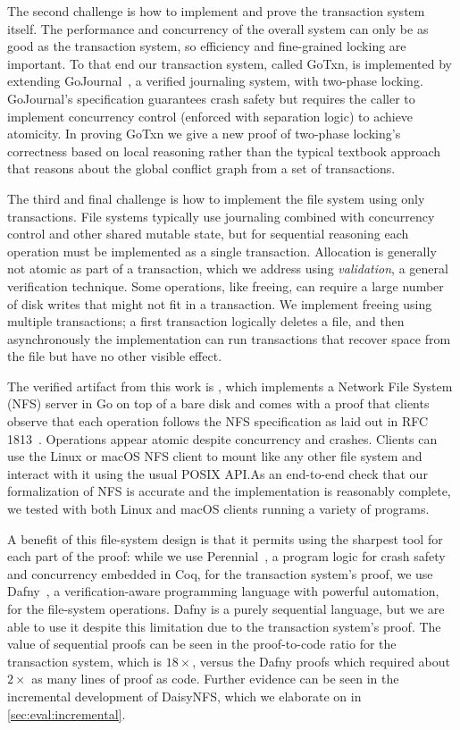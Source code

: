 The second challenge is how to implement and prove the transaction system
itself. The performance and concurrency of the overall system can only be as
good as the transaction system, so efficiency and fine-grained locking are
important. To that end our transaction system, called GoTxn, is implemented by
extending GoJournal~\cite{chajed:gojournal}, a verified journaling system, with
two-phase locking. GoJournal's specification guarantees crash safety but
requires the caller to implement concurrency control (enforced with separation logic) to achieve atomicity.
In proving GoTxn we give a new proof of two-phase
locking's correctness based on local reasoning rather than
the typical textbook approach that reasons about the global conflict graph from
a set of transactions.

The third and final challenge is how to implement the file system using only
transactions. File systems typically use journaling combined with concurrency
control and other shared mutable state, but for sequential reasoning each
operation must be implemented as a single transaction. Allocation is generally
not atomic as part of a transaction, which we address using \emph{validation}, a
general verification technique.
Some operations, like freeing, can require a large
number of disk writes that might not fit in a transaction. We implement freeing
using multiple transactions; a first transaction logically deletes a file, and
then asynchronously the implementation can run transactions that recover space
from the file but have no other visible effect.

The verified artifact from this work is \sys, which implements a
Network File System (NFS) server in Go on top of a bare disk and comes
with a proof that clients observe that each operation follows the NFS
specification as laid out in RFC 1813~\cite{RFC:1813}. Operations appear atomic
despite concurrency and crashes. Clients can use the Linux or macOS
NFS client to mount \sys like any other file system and interact with
it using the usual POSIX API.\@  As an end-to-end check that our
formalization of NFS is accurate and the implementation is reasonably
complete, we tested with both Linux and macOS clients running a
variety of programs.

A benefit of this file-system design is that it permits using the
sharpest tool for each part of the proof: while we use
Perennial~\cite{chajed:gojournal}, a program logic for crash safety
and concurrency embedded in Coq, for the
transaction system's proof, we use Dafny~\cite{leino:dafny}, a verification-aware
programming language with powerful automation, for the file-system operations.
Dafny is a purely sequential language, but we are able to use it despite this
limitation due to the transaction system's proof. The value of
sequential proofs can be seen in the proof-to-code ratio for the transaction
system, which is $18\times$, versus the Dafny proofs which required about
$2\times$ as many lines of proof as code. Further evidence can be seen in the
incremental development of DaisyNFS, which we elaborate on in
\autoref{sec:eval:incremental}.

